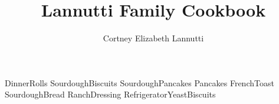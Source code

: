 \documentclass[a4paper]{article}
\title{Lannutti Family Cookbook}
\author{Cortney Elizabeth Lannutti}
\date{}
\begin{document}
\maketitle

{DinnerRolls}
{SourdoughBiscuits}
{SourdoughPancakes}
{Pancakes}
{FrenchToast}
{SourdoughBread}
{RanchDressing}
{RefrigeratorYeastBiscuits}
\end{document}
